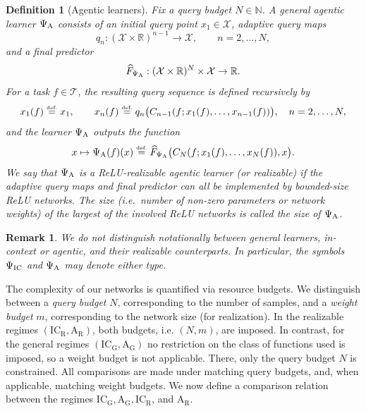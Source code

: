 \documentclass{article}
\newtheorem{definition}{Definition}[section]
\newtheorem{remark}{Remark}[section]
\newcommand{\eqdef }{\ensuremath{\stackrel{\mbox{\upshape\tiny def.}}{=}}}
\newcommand{\ICG}{\mathrm{IC_G}}
\newcommand{\ICR}{\mathrm{IC_R}}
\newcommand{\AG}{\mathrm{A_G}}
\newcommand{\AR}{\mathrm{A_R}}
\begin{document}
\begin{definition}[Agentic learners]
Fix a query budget $N\in\mathbb N$. A \emph{general agentic learner} $\Psi_{\rm A}$ consists of an initial
query point $x_1\in\mathcal X$, adaptive query maps
\begin{equation} \label{querymaps}
    q_n:(\mathcal X\times\mathbb R)^{n-1}\to\mathcal X,
    \qquad n=2,\dots,N,
\end{equation}
and a final predictor
\[
\widehat{F}_{\Psi_{\rm A}}:(\mathcal X\times\mathbb R)^N\times\mathcal X\to\mathbb R.
\]
For a task $f\in\mathcal T$, the resulting query sequence is defined recursively by
\[
x_1(f)\eqdef  x_1,
\qquad
x_n(f)\eqdef  q_n\bigl(C_{n-1}(f;x_1(f),\dots,x_{n-1}(f))\bigr),
\quad n=2,\dots,N,
\]
and the learner $\Psi_{\rm A}$ outputs the function
\begin{equation} \label{finpredictor}
    x\mapsto \Psi_{\rm A}(f)(x) \eqdef 
 \widehat{F}_{\Psi_{\rm A}}
 \bigl(C_N(f;x_1(f),\dots,x_N(f)),x\bigr).
\end{equation}
We say that $\Psi_{\rm A}$ is a \emph{ReLU-realizable agentic learner} (or \emph{realizable}) if the adaptive query maps and final predictor can all be
implemented by bounded-size ReLU networks. 
The size (i.e.\ number of non-zero parameters or network weights) of the largest of the involved ReLU networks is called the size of $\Psi_{\rm A}$.
\end{definition}


\begin{remark}
We do \emph{not} distinguish notationally between general learners, in-context or agentic, and their realizable counterparts.
In particular, the symbols $\Psi_{\rm IC}$ and $\Psi_{\rm A}$ may denote either type.
\end{remark}


The complexity of our networks is quantified via resource budgets. We distinguish between a \emph{query budget} $N$, corresponding to the number of samples, and a \emph{weight budget} $m$, corresponding to the network size (for realization). 
In the realizable regimes $(\ICR, \AR)$, both budgets, i.e. $(N,m)$, are imposed. In contrast, for the general regimes $(\ICG, \AG)$ no restriction on the class of functions used is imposed, so a weight budget is not applicable. There, only the query budget $N$ is constrained. All comparisons are made under matching query budgets, and, when applicable, matching weight budgets.
We now define a comparison relation between the regimes $\ICG, \AG, \ICR$, and $\AR$. 
% 
\end{document}
